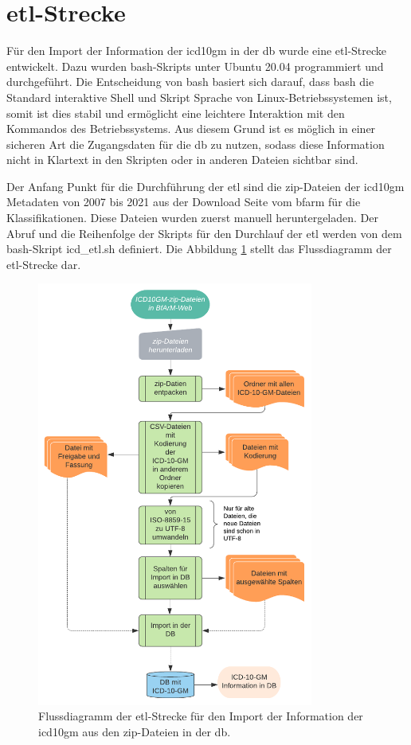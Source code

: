 \section{\acs{etl}-Strecke} \label{etlpipeline}

Für den Import der Information der \ac{icd10gm} in der \ac{db} wurde eine \ac{etl}-Strecke entwickelt. Dazu wurden \ac{bash}-Skripts unter Ubuntu 20.04 programmiert und durchgeführt. Die Entscheidung von \ac{bash} basiert sich darauf, dass \ac{bash} die Standard interaktive Shell und Skript Sprache von Linux-Betriebssystemen ist, somit ist dies stabil und ermöglicht eine leichtere Interaktion mit den Kommandos des Betriebssystems. Aus diesem Grund ist es möglich in einer sicheren Art die Zugangsdaten für die \ac{db} zu nutzen, sodass diese Information nicht in Klartext in den Skripten oder in anderen Dateien sichtbar sind.

Der Anfang Punkt für die Durchführung der \ac{etl} sind die \ac{zip}-Dateien der \ac{icd10gm} Metadaten von 2007 bis 2021 aus der Download Seite vom \ac{bfarm} für die Klassifikationen. Diese Dateien wurden zuerst manuell heruntergeladen. Der Abruf und die Reihenfolge der Skripts für den Durchlauf der \ac{etl} werden von dem \ac{bash}-Skript \textsf{icd\_etl.sh} definiert. Die Abbildung \ref{fig:etl} stellt das Flussdiagramm der \ac{etl}-Strecke dar.

\clearpage
\begin{figure}[ht]
	\centering
	\includegraphics[height=14cm]{figures/etl}
	\caption[\acs{etl}-Strecke]{Flussdiagramm der \acs{etl}-Strecke für den Import der Information der \ac{icd10gm} aus den \ac{zip}-Dateien in der \ac{db}.}
	\label{fig:etl}
\end{figure} 

